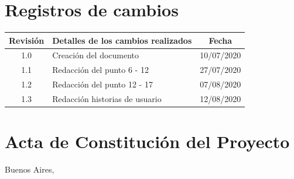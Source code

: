 \documentclass[11pt]{charter}
\begin{document}
\maketitle
\thispagestyle{empty}
\pagebreak


\thispagestyle{empty}
{\setlength{\parskip}{0pt}
\tableofcontents{}
}
\pagebreak


\section{Registros de cambios}
\label{sec:registro}


\begin{table}[ht]
\label{tab:registro}
\centering

\begin{tabularx}{\linewidth}{@{}|c|X|c|@{}}
\hline
\rowcolor[HTML]{C0C0C0} 
Revisión & \multicolumn{1}{c|}{\cellcolor[HTML]{C0C0C0}Detalles de los cambios realizados} & Fecha      \\ \hline
1.0      & Creación del documento                                                          & 10/07/2020 \\ \hline
1.1      & Redacción del punto 6 - 12                                                      & 27/07/2020 \\ \hline
1.2      & Redacción del punto 12 - 17                                                     & 07/08/2020 \\ \hline
1.3      & Redacción historias de usuario                                                  & 12/08/2020 \\ \hline
\end{tabularx}
\end{table}

\pagebreak



\section{Acta de Constitución del Proyecto}
\label{sec:acta}

\begin{flushright}
Buenos Aires, \fechaInicioName
\end{flushright}

\vspace{2cm}
\end{document}
